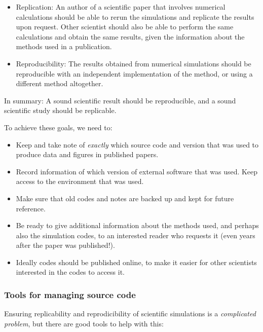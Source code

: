 \documentclass[11pt]{article}
\begin{document}
\begin{itemize}
\item
  Replication: An author of a scientific paper that involves numerical
  calculations should be able to rerun the simulations and replicate the
  results upon request. Other scientist should also be able to perform
  the same calculations and obtain the same results, given the
  information about the methods used in a publication.
\item
  Reproducibility: The results obtained from numerical simulations
  should be reproducible with an independent implementation of the
  method, or using a different method altogether.
\end{itemize}

In summary: A sound scientific result should be reproducible, and a
sound scientific study should be replicable.

To achieve these goals, we need to:

\begin{itemize}
\item
  Keep and take note of \emph{exactly} which source code and version
  that was used to produce data and figures in published papers.
\item
  Record information of which version of external software that was
  used. Keep access to the environment that was used.
\item
  Make sure that old codes and notes are backed up and kept for future
  reference.
\item
  Be ready to give additional information about the methods used, and
  perhaps also the simulation codes, to an interested reader who
  requests it (even years after the paper was published!).
\item
  Ideally codes should be published online, to make it easier for other
  scientists interested in the codes to access it.
\end{itemize}

    \hypertarget{tools-for-managing-source-code}{%
\subsubsection{Tools for managing source
code}\label{tools-for-managing-source-code}}

    Ensuring replicability and reprodicibility of scientific simulations is
a \emph{complicated problem}, but there are good tools to help with
this:
\end{document}
